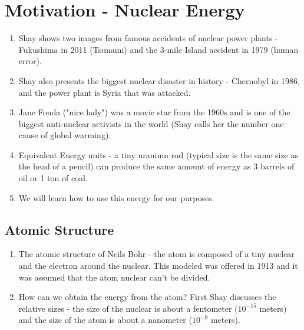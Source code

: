 \documentclass[11pt]{article}
\begin{document}
\section{Motivation - Nuclear Energy}
\begin{enumerate}
    \item Shay shows two images from famous accidents of nuclear power plants - Fukushima in 2011 (Tsunami) and the 3-mile Island accident in 1979 (human error).
    \item Shay also presents the biggest nuclear disaster in history - Chernobyl in 1986, and the power plant is Syria that was attacked.
    \item Jane Fonda ("nice lady") was a movie star from the 1960s and is one of the biggest anti-nuclear activists in the world (Shay calls her the number one cause of global warming).
    \item Equivalent Energy units - a tiny uranium rod (typical size is the same size as the head of a pencil) can produce the same amount of energy as 3 barrels of oil or 1 ton of coal.
    \item We will learn how to use this energy for our purposes.
\end{enumerate}
\subsection{Atomic Structure}
\begin{enumerate}
    \item The atomic structure of Neils Bohr - the atom is composed of a tiny nuclear and the electron around the nuclear. This modeled was offered in 1913 and it was assumed that the atom nuclear can't be divided.
    \item How can we obtain the energy from the atom? First Shay discusses the relative sizes - the size of the nuclear is about a fentometer ($10^{-15}$ meters) and the size of the atom is about a nanometer ($10^{-9}$ meters).
\end{enumerate}
\end{document}
